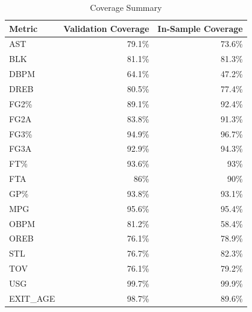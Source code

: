 \begin{table}[t]
\caption*{
{\large Coverage Summary}
} 
\fontsize{12.0pt}{14.4pt}\selectfont
\begin{tabular*}{\linewidth}{@{\extracolsep{\fill}}lrr}
\toprule
Metric & Validation Coverage & In-Sample Coverage \\ 
\midrule\addlinespace[2.5pt]
AST & 79.1\% & 73.6\% \\ 
BLK & 81.1\% & 81.3\% \\ 
DBPM & 64.1\% & 47.2\% \\ 
DREB & 80.5\% & 77.4\% \\ 
FG2\% & 89.1\% & 92.4\% \\ 
FG2A & 83.8\% & 91.3\% \\ 
FG3\% & 94.9\% & 96.7\% \\ 
FG3A & 92.9\% & 94.3\% \\ 
FT\% & 93.6\% & 93\% \\ 
FTA & 86\% & 90\% \\ 
GP\% & 93.8\% & 93.1\% \\ 
MPG & 95.6\% & 95.4\% \\ 
OBPM & 81.2\% & 58.4\% \\ 
OREB & 76.1\% & 78.9\% \\ 
STL & 76.7\% & 82.3\% \\ 
TOV & 76.1\% & 79.2\% \\ 
USG & 99.7\% & 99.9\% \\ 
EXIT\_AGE & 98.7\% & 89.6\% \\ 
\bottomrule
\end{tabular*}
\end{table}

